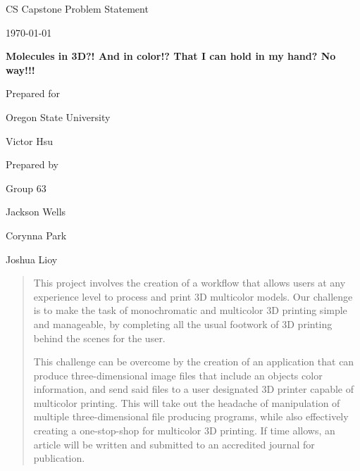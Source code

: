 \documentclass[onecolumn, draftclsnofoot,10pt, compsoc]{IEEEtran}
\def \CapstoneTeamName{		The Cleverly Named Team}
\def \CapstoneTeamNumber{		63}
\def \GroupMemberOne{			Jackson Wells}
\def \GroupMemberTwo{			Corynna Park}
\def \GroupMemberThree{			Joshua Lioy}
\def \CapstoneProjectName{		Molecules in 3D?! And in color!? That I can hold in my hand? No way!!!}
\def \CapstoneSponsorCompany{	Oregon State University}
\def \CapstoneSponsorPerson{		Victor Hsu}
\def \DocType{		Problem Statement
				}
\newcommand{\NameSigPair}[1]{\par
\makebox[2.75in][r]{#1} \hfil 	\makebox[3.25in]{\makebox[2.25in]{\hrulefill} \hfill		\makebox[.75in]{\hrulefill}}
\par\vspace{-12pt} \textit{\tiny\noindent
\makebox[2.75in]{} \hfil		\makebox[3.25in]{\makebox[2.25in][r]{Signature} \hfill	\makebox[.75in][r]{Date}}}}
\renewcommand{\NameSigPair}[1]{#1}
\begin{document}
\begin{titlepage}
    \begin{singlespace}
        \hfill 
        \par\vspace{.2in}
        \centering
        \scshape{
            \huge CS Capstone \DocType \par
            {\large\today}\par
            \vspace{.5in}
            \textbf{\Huge\CapstoneProjectName}\par
            \vfill
            {\large Prepared for}\par
            \Huge \CapstoneSponsorCompany\par
            \vspace{5pt}
            {\Large\NameSigPair{\CapstoneSponsorPerson}\par}
            {\large Prepared by }\par
            Group\CapstoneTeamNumber\par
            \vspace{5pt}
            {\Large
                \NameSigPair{\GroupMemberOne}\par
                \NameSigPair{\GroupMemberTwo}\par
                \NameSigPair{\GroupMemberThree}\par
            }
            \vspace{20pt}
        }
        \begin{abstract}
		This project involves the creation of a workflow that allows users at any experience level to process and print 3D multicolor models.
		Our challenge is to make the task of monochromatic and multicolor 3D printing simple and manageable, by completing all the usual footwork of 3D printing behind the scenes for the user.

		This challenge can be overcome by the creation of an application that can produce three-dimensional image files that include an objects color information, and send said files to a user designated 3D printer capable of multicolor printing.
		This will take out the headache of manipulation of multiple three-dimensional file producing programs, while also effectively creating a one-stop-shop for multicolor 3D printing.
 		If time allows, an article will be written and submitted to an accredited journal for publication.
        \end{abstract}     
    \end{singlespace}
\end{titlepage}
\newpage
{}
\tableofcontents
\clearpage
\end{document}
